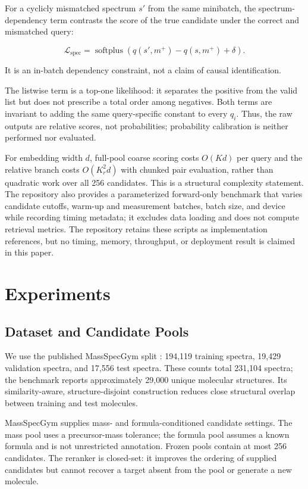 \documentclass[runningheads]{llncs}
\begin{document}
For a cyclicly mismatched spectrum $s'$ from the same minibatch, the
spectrum-dependency term contrasts the score of the true candidate under the
correct and mismatched query:

\begin{equation}
  \mathcal{L}_{\mathrm{spec}}
  =\operatorname{softplus}\!\left(
  q(s',m^+)-q(s,m^+)+\delta\right).
  \label{eq:spectrum_dependency}
\end{equation}

It is an in-batch dependency constraint, not a claim of causal identification.

The listwise term is a top-one likelihood: it separates the positive from the
valid list but does not prescribe a total order among negatives. Both terms are
invariant to adding the same query-specific constant to every $q_i$. Thus, the
raw outputs are relative scores, not probabilities; probability calibration is
neither performed nor evaluated.

For embedding width $d$, full-pool coarse scoring costs $O(Kd)$ per query and
the relative branch costs $O(K_r^2d)$ with chunked pair evaluation, rather than
quadratic work over all 256 candidates. This is a structural complexity
statement. The repository also provides a parameterized forward-only benchmark
that varies candidate cutoffs, warm-up and measurement batches, batch size, and
device while recording timing metadata; it excludes data loading and does not
compute retrieval metrics. The repository retains these scripts as
implementation references, but no timing, memory, throughput, or deployment
result is claimed in this paper.

\section{Experiments}

\subsection{Dataset and Candidate Pools}

We use the published MassSpecGym split \cite{bushuiev2024massspecgym}: 194,119
training spectra, 19,429 validation spectra, and 17,556 test spectra. These
counts total 231,104 spectra; the benchmark reports approximately 29,000 unique
molecular structures. Its similarity-aware, structure-disjoint construction
reduces close structural overlap between training and test molecules.

MassSpecGym supplies mass- and formula-conditioned candidate settings. The mass
pool uses a precursor-mass tolerance; the formula pool assumes a known formula
and is not unrestricted annotation. Frozen pools contain at most 256 candidates.
The reranker is closed-set: it improves the ordering of supplied candidates but
cannot recover a target absent from the pool or generate a new molecule.
\end{document}

